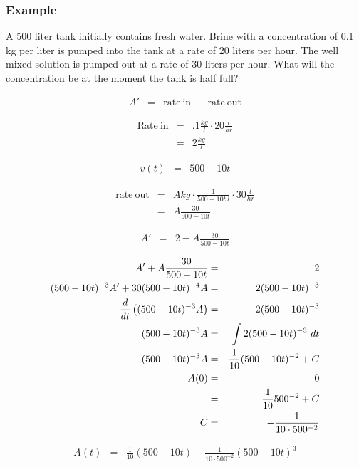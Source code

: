 \begin{frame}
  \frametitle{Example}

  A 500 liter tank initially contains fresh water. Brine with a
  concentration of 0.1 kg per liter is pumped into the tank at a rate
  of 20 liters per hour. The well mixed solution is pumped out at a
  rate of 30 liters per hour. What will the concentration be at the
  moment the tank is half full?

\end{frame}


\begin{frame}

  \begin{eqnarray*}
    A' & = & \mathrm{rate~in~} - \mathrm{~rate~out}
  \end{eqnarray*}

  \begin{eqnarray*}
    \mathrm{Rate~in} & = & .1 \frac{kg}{l} \cdot 20 \frac{l}{hr} \\
    & = & 2 \frac{kg}{l}
  \end{eqnarray*}

  \begin{eqnarray*}
    v(t) & = & 500-10t
  \end{eqnarray*}

  \begin{eqnarray*}
    \mathrm{rate~out} & = & A kg \cdot \frac{1}{500-10t ~ l} \cdot 30 \frac{l}{hr} \\
    & = & A \frac{30}{500-10t}
  \end{eqnarray*}

  \begin{eqnarray*}
    A' & = & 2 - A \frac{30}{500-10t}
  \end{eqnarray*}

\end{frame}


\begin{frame}

  \begin{eqnarray*}
    A' + A \frac{30}{500-10t} & = & 2 \\
    (500-10t)^{-3} A' + 30(500-10t)^{-4} A & = & 2 (500-10t)^{-3} \\
    \frac{d}{dt} \left( (500-10t)^{-3} A \right) & = & 2 (500-10t)^{-3} \\
    (500-10t)^{-3} A  & = & \int 2 (500-10t)^{-3} ~ dt  \\
    (500-10t)^{-3} A  & = & \frac{1}{10} (500-10t)^{-2} + C  \\
    A(0) & = & 0 \\
    & = & \frac{1}{10} 500^{-2} + C \\
    C & = & -\frac{1}{10\cdot500^{-2}}
  \end{eqnarray*}

  \begin{eqnarray*}
    A(t) & = & \frac{1}{10} (500-10t) - \frac{1}{10\cdot500^{-2}} (500-10t)^3
  \end{eqnarray*}

\end{frame}



